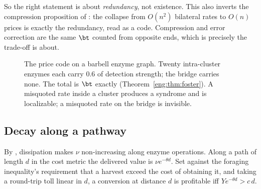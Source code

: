 So the right statement is about \emph{redundancy}, not existence. This also
inverts the compression proposition of \cite[\S5]{vtok}: the collapse from
$O(n^2)$ bilateral rates to $O(n)$ prices is exactly the redundancy, read
as a code. Compression and error correction are the same $\bt$ counted from
opposite ends, which is precisely the trade-off \cite{compaut} is about.

\begin{figure}[t]
\centering
{}
\caption{The price code on a barbell enzyme graph. Twenty intra-cluster
enzymes each carry $0.6$ of detection strength; the bridge carries none.
The total is $\bt$ exactly (Theorem~\ref{eng:thm:foster}). A misquoted rate
inside a cluster produces a syndrome and is localizable; a misquoted rate
on the bridge is invisible.}
\label{eng:fig:barbell}
\end{figure}

\subsection{Decay along a pathway}\label{eng:S6.4}
\label{eng:sec:decay}

By \cite[Prop.~6.1]{vtok}, dissipation makes $\nu$ non-increasing along
enzyme operations. Along a path of length $d$ in the cost metric the
delivered value is $\nu e^{-\theta d}$. Set against the foraging
inequality's requirement that a harvest exceed the cost of obtaining it,
and taking a round-trip toll linear in $d$, a conversion at distance $d$ is
profitable iff $Y e^{-\theta d} > c\,d$.

